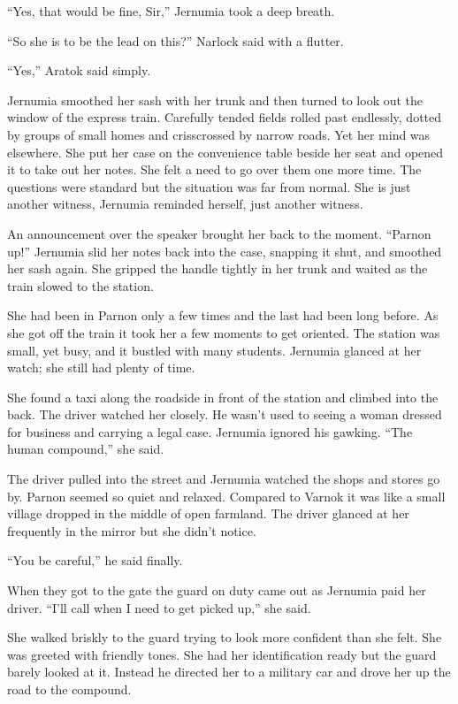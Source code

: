 ``Yes, that would be fine, Sir,'' Jernumia took a deep breath.

``So she is to be the lead on this?'' Narlock said with a flutter.

``Yes,'' Aratok said simply.

\spacebreak

Jernumia smoothed her sash with her trunk and then turned to look out the window of the express
train. Carefully tended fields rolled past endlessly, dotted by groups of small homes and
crisscrossed by narrow roads. Yet her mind was elsewhere. She put her case on the convenience
table beside her seat and opened it to take out her notes. She felt a need to go over them one
more time. The questions were standard but the situation was far from normal. She is just
another witness, Jernumia reminded herself, just another witness.

An announcement over the speaker brought her back to the moment. ``Parnon up!'' Jernumia slid
her notes back into the case, snapping it shut, and smoothed her sash again. She gripped the
handle tightly in her trunk and waited as the train slowed to the station.

She had been in Parnon only a few times and the last had been long before. As she got off the
train it took her a few moments to get oriented. The station was small, yet busy, and it bustled
with many students. Jernumia glanced at her watch; she still had plenty of time.

She found a taxi along the roadside in front of the station and climbed into the back. The
driver watched her closely. He wasn't used to seeing a woman dressed for business and carrying a
legal case. Jernumia ignored his gawking. ``The human compound,'' she said.

The driver pulled into the street and Jernumia watched the shops and stores go by. Parnon seemed
so quiet and relaxed. Compared to Varnok it was like a small village dropped in the middle of
open farmland. The driver glanced at her frequently in the mirror but she didn't notice.

``You be careful,'' he said finally.

When they got to the gate the guard on duty came out as Jernumia paid her driver. ``I'll call
when I need to get picked up,'' she said.

She walked briskly to the guard trying to look more confident than she felt. She was greeted
with friendly tones. She had her identification ready but the guard barely looked at it. Instead
he directed her to a military car and drove her up the road to the compound.

